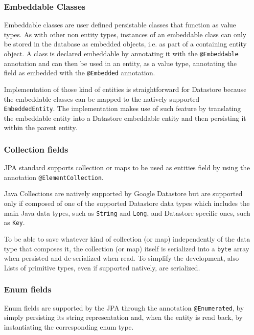 \subsubsection{Embeddable Classes}
Embeddable classes are user defined persistable classes that function as value types. As with other non entity types, instances of an embeddable class can only be stored in the database as embedded objects, i.e. as part of a containing entity object.
A class is declared embeddable by annotating it with the \texttt{@Embeddable} annotation and can then be used in an entity, as a value type, annotating the field as embedded with the \texttt{@Embedded} annotation. 

\noindent Implementation of those kind of entities is straightforward for Datastore because the embeddable classes can be mapped to the natively supported \texttt{EmbeddedEntity}.
\noindent The implementation makes use of such feature by translating the embeddable entity into a Datastore embeddable entity and then persisting it within the parent entity.

\subsubsection{Collection fields}
JPA standard supports collection or maps to be used as entities field by using the annotation \texttt{@ElementCollection}.

\newparagraph Java Collections are natively supported by Google Datastore but are supported only if composed of one of the supported Datastore data types which includes the main Java data types, such as \texttt{String} and \texttt{Long}, and Datastore specific ones, such as \texttt{Key}.

\noindent To be able to save whatever kind of collection (or map) independently of the data type that composes it, the collection (or map) itself is serialized into a \texttt{byte} array when persisted and de-serialized when read.
\noindent To simplify the development, also Lists of primitive types, even if supported natively, are serialized.

\subsubsection{Enum fields}
Enum fields are supported by the JPA through the annotation \texttt{@Enumerated}, by simply  persisting its string representation and, when the entity is read back, by instantiating the corresponding enum type.

